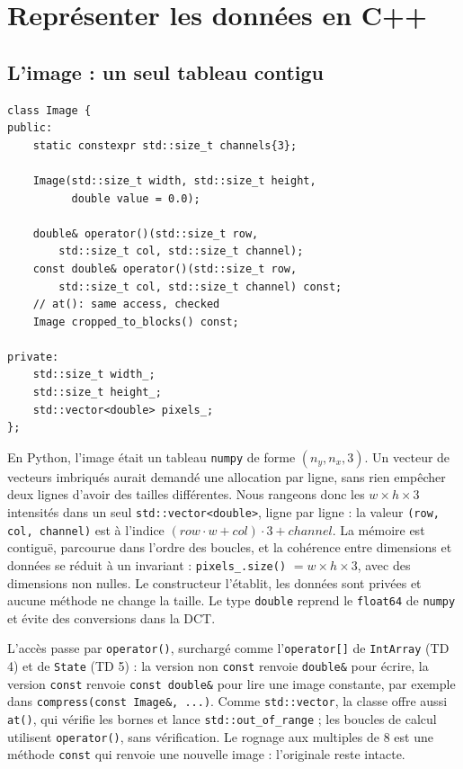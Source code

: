 \documentclass[10pt,a4paper]{article}
\newcommand{\code}[1]{\texttt{#1}}
\begin{document}
\section{Représenter les données en C++}

\subsection{L'image : un seul tableau contigu}
\begin{minipage}[t]{0.45\textwidth}
\vspace{0pt}
\begin{lstlisting}
class Image {
public:
    static constexpr std::size_t channels{3};

    Image(std::size_t width, std::size_t height,
          double value = 0.0);

    double& operator()(std::size_t row,
        std::size_t col, std::size_t channel);
    const double& operator()(std::size_t row,
        std::size_t col, std::size_t channel) const;
    // at(): same access, checked
    Image cropped_to_blocks() const;

private:
    std::size_t width_;
    std::size_t height_;
    std::vector<double> pixels_;
};
\end{lstlisting}
\end{minipage}\hfill
\begin{minipage}[t]{0.525\textwidth}
\vspace{0pt}
En Python, l'image était un tableau \code{numpy} de forme $(n_y, n_x, 3)$. Un vecteur de
vecteurs imbriqués aurait demandé une allocation par ligne, sans rien empêcher deux lignes
d'avoir des tailles différentes. Nous rangeons donc les $w\times h\times 3$ intensités dans un
seul \code{std::vector<double>}, ligne par ligne : la valeur \code{(row, col, channel)} est à
l'indice $(\mathit{row}\cdot w + \mathit{col})\cdot 3 + \mathit{channel}$. La mémoire est
contiguë, parcourue dans l'ordre des boucles, et la cohérence entre dimensions et données se
réduit à un invariant : \code{pixels\_.size()} $= w\times h\times 3$, avec des dimensions non
nulles. Le constructeur l'établit, les données sont privées et aucune méthode ne change la
taille. Le type \code{double} reprend le \code{float64} de \code{numpy} et évite des
conversions dans la DCT.
\end{minipage}

\smallskip
L'accès passe par \code{operator()}, surchargé comme l'\code{operator[]} de \code{IntArray}
(TD 4) et de \code{State} (TD 5) : la version non \code{const} renvoie \code{double\&} pour
écrire, la version \code{const} renvoie \code{const double\&} pour lire une image constante,
par exemple dans \code{compress(const Image\&, ...)}. Comme \code{std::vector}, la classe offre
aussi \code{at()}, qui vérifie les bornes et lance \code{std::out\_of\_range} ; les boucles de
calcul utilisent \code{operator()}, sans vérification. Le rognage aux multiples de 8 est une
méthode \code{const} qui renvoie une nouvelle image : l'originale reste intacte.
\end{document}
